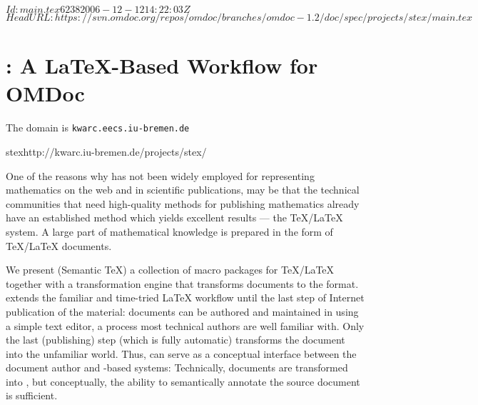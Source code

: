 \svnInfo $Id: main.tex 6238 2006-12-12 14:22:03Z  $
\svnKeyword $HeadURL: https://svn.omdoc.org/repos/omdoc/branches/omdoc-1.2/doc/spec/projects/stex/main.tex $

\section{\protect\stex: A {\LaTeX}-Based Workflow for OMDoc}
\begin{erratum}[reported-by=Christoph Lange,date=2006-12-12]{The domain is \texttt{kwarc.eecs.iu-bremen.de}}
\begin{project}{stex}{http://kwarc.iu-bremen.de/projects/stex/}
\end{project}
\end{erratum}

One of the reasons why {\omdoc} has not been widely employed for representing mathematics
on the web and in scientific publications, may be that the technical communities that need
high-quality methods for publishing mathematics already have an established method which
yields excellent results --- the {\TeX/\LaTeX} system. A large part of mathematical
knowledge is prepared in the form of {\TeX}/{\LaTeX} documents.

We present {\stex} (Semantic {\TeX}) a collection of macro packages for {\TeX/\LaTeX}
together with a transformation engine that transforms {\stex} documents to the {\omdoc}
format. {\stex} extends the familiar and time-tried {\LaTeX} workflow until the last step
of Internet publication of the material: documents can be authored and maintained in
{\stex} using a simple text editor, a process most technical authors are well familiar
with. Only the last (publishing) step (which is fully automatic) transforms the document
into the unfamiliar {\xml} world. Thus, {\stex} can serve as a conceptual interface
between the document author and {\omdoc}-based systems: Technically, {\stex} documents are
transformed into {\omdoc}, but conceptually, the ability to semantically annotate the
source document is sufficient.

